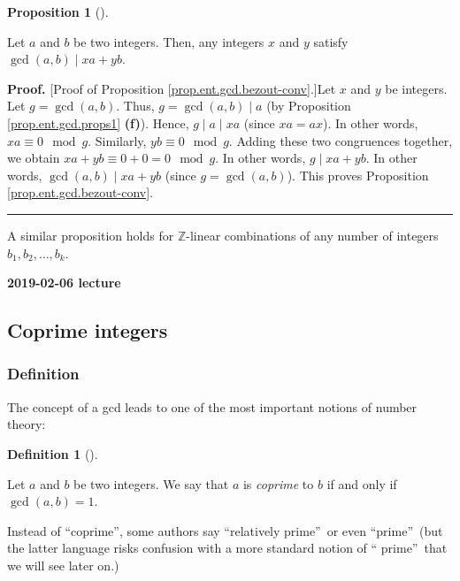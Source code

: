 \documentclass[numbers=enddot,12pt,final,onecolumn,notitlepage]{scrartcl}%
\numberwithin{exer}{subsection}
\theoremstyle{definition}
\newtheorem{prop}[theo]{Proposition}
\newenvironment{proposition}[1][]
{\begin{prop}[#1]\begin{leftbar}}
{\end{leftbar}\end{prop}}
\newtheorem{defi}[theo]{Definition}
\newenvironment{definition}[1][]
{\begin{defi}[#1]\begin{leftbar}}
{\end{leftbar}\end{defi}}
\newenvironment{proof}[1][Proof]{\noindent\textbf{#1.} }{\ \rule{0.5em}{0.5em}}
\begin{document}
\begin{proposition}
\label{prop.ent.gcd.bezout-conv}Let $a$ and $b$ be two integers. Then, any
integers $x$ and $y$ satisfy $\gcd\left(  a, b \right)  \mid xa + yb$.
\end{proposition}

\begin{proof}
[Proof of Proposition \ref{prop.ent.gcd.bezout-conv}.]Let $x$ and $y$ be
integers. Let $g = \gcd\left(  a, b \right)  $. Thus, $g = \gcd\left(  a, b
\right)  \mid a$ (by Proposition \ref{prop.ent.gcd.props1} \textbf{(f)}).
Hence, $g \mid a \mid xa$ (since $xa = ax$). In other words, $xa \equiv0
\mod g$. Similarly, $yb \equiv0 \mod g$. Adding these two congruences
together, we obtain $xa + yb \equiv0 + 0 = 0 \mod g$. In other words, $g \mid
xa + yb$. In other words, $\gcd\left(  a, b \right)  \mid xa + yb$ (since $g =
\gcd\left(  a, b \right)  $). This proves Proposition
\ref{prop.ent.gcd.bezout-conv}.
\end{proof}

A similar proposition holds for $\mathbb{Z}$-linear combinations of any number
of integers $b_{1}, b_{2}, \ldots, b_{k}$.

\begin{center}
\textbf{2019-02-06 lecture}
\end{center}

\subsection{Coprime integers}

\subsubsection{Definition}

The concept of a gcd leads to one of the most important notions of number theory:

\begin{definition}
\label{def.ent.coprime.coprime}Let $a$ and $b$ be two integers. We say that
$a$ is \textit{coprime} to $b$ if and only if $\gcd\left(  a,b\right)  =1$.
\end{definition}

Instead of \textquotedblleft coprime\textquotedblright, some authors say
\textquotedblleft relatively prime\textquotedblright\ or even
\textquotedblleft prime\textquotedblright\ (but the latter language risks
confusion with a more standard notion of \textquotedblleft
prime\textquotedblright\ that we will see later on.)
\end{document}
